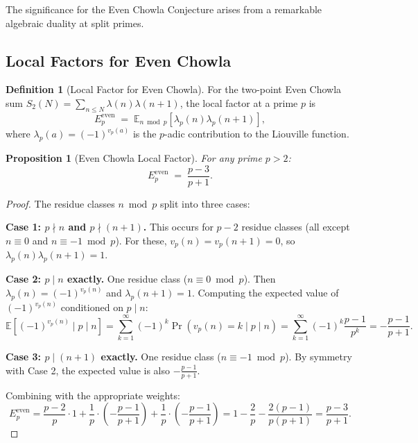 \documentclass[11pt,a4paper]{article}
\theoremstyle{plain}
\newtheorem{proposition}[theorem]{Proposition}
\theoremstyle{definition}
\newtheorem{definition}[theorem]{Definition}
\begin{document}
The significance for the Even Chowla Conjecture arises from a remarkable algebraic duality at split primes.

\subsection{Local Factors for Even Chowla}

\begin{definition}[Local Factor for Even Chowla]
For the two-point Even Chowla sum $S_2(N) = \sum_{n \leq N} \lambda(n)\lambda(n+1)$, the local factor at a prime $p$ is
\begin{equation}\label{eq:local-even}
E_p^{\mathrm{even}} \;=\; \mathbb{E}_{n \bmod p}\!\left[\lambda_p(n) \lambda_p(n+1)\right],
\end{equation}
where $\lambda_p(a) = (-1)^{v_p(a)}$ is the $p$-adic contribution to the Liouville function.
\end{definition}

\begin{proposition}[Even Chowla Local Factor]\label{prop:local-even}
For any prime $p > 2$:
\begin{equation}\label{eq:even-local}
E_p^{\mathrm{even}} \;=\; \frac{p - 3}{p + 1}.
\end{equation}
\end{proposition}

\begin{proof}
The residue classes $n \bmod p$ split into three cases:

\textbf{Case 1: $p \nmid n$ and $p \nmid (n+1)$.} This occurs for $p - 2$ residue classes (all except $n \equiv 0$ and $n \equiv -1 \bmod p$). For these, $v_p(n) = v_p(n+1) = 0$, so $\lambda_p(n)\lambda_p(n+1) = 1$.

\textbf{Case 2: $p \mid n$ exactly.} One residue class ($n \equiv 0 \bmod p$). Then $\lambda_p(n) = (-1)^{v_p(n)}$ and $\lambda_p(n+1) = 1$. Computing the expected value of $(-1)^{v_p(n)}$ conditioned on $p \mid n$:
\[
\mathbb{E}[(-1)^{v_p(n)} \mid p \mid n] = \sum_{k=1}^{\infty} (-1)^k \Pr(v_p(n) = k \mid p \mid n) = \sum_{k=1}^{\infty} (-1)^k \frac{p-1}{p^k} = -\frac{p-1}{p+1}.
\]

\textbf{Case 3: $p \mid (n+1)$ exactly.} One residue class ($n \equiv -1 \bmod p$). By symmetry with Case 2, the expected value is also $-\frac{p-1}{p+1}$.

Combining with the appropriate weights:
\[
E_p^{\mathrm{even}} = \frac{p-2}{p} \cdot 1 + \frac{1}{p} \cdot \left(-\frac{p-1}{p+1}\right) + \frac{1}{p} \cdot \left(-\frac{p-1}{p+1}\right) = 1 - \frac{2}{p} - \frac{2(p-1)}{p(p+1)} = \frac{p-3}{p+1}.
\]
\end{proof}
\end{document}
